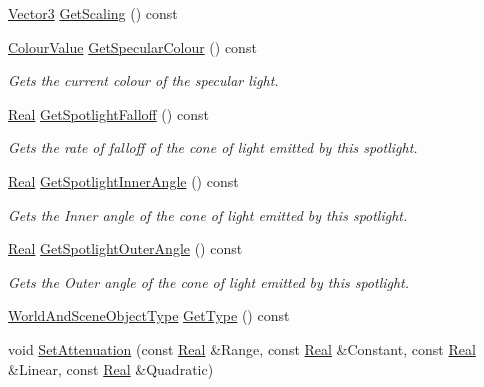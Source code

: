 \begin{DoxyCompactItemize}
\hyperlink{classMezzanine_1_1Vector3}{Vector3} \hyperlink{classMezzanine_1_1Light_ac8742d7d9ac0b4059eeed80b4b566471}{GetScaling} () const 
\item 
\hyperlink{classMezzanine_1_1ColourValue}{ColourValue} \hyperlink{classMezzanine_1_1Light_af3cef4b433cc3563ae3abd3675c5b922}{GetSpecularColour} () const 
\begin{DoxyCompactList}\small\item\em Gets the current colour of the specular light. \item\end{DoxyCompactList}\item 
\hyperlink{namespaceMezzanine_a726731b1a7df72bf3583e4a97282c6f6}{Real} \hyperlink{classMezzanine_1_1Light_adc25087fe48fe78c1bae8785c28d30e0}{GetSpotlightFalloff} () const 
\begin{DoxyCompactList}\small\item\em Gets the rate of falloff of the cone of light emitted by this spotlight. \item\end{DoxyCompactList}\item 
\hyperlink{namespaceMezzanine_a726731b1a7df72bf3583e4a97282c6f6}{Real} \hyperlink{classMezzanine_1_1Light_a88bb2a7515c4f67c8d367acfc1764420}{GetSpotlightInnerAngle} () const 
\begin{DoxyCompactList}\small\item\em Gets the Inner angle of the cone of light emitted by this spotlight. \item\end{DoxyCompactList}\item 
\hyperlink{namespaceMezzanine_a726731b1a7df72bf3583e4a97282c6f6}{Real} \hyperlink{classMezzanine_1_1Light_a750426a53eeed92787c996f8b35c1d32}{GetSpotlightOuterAngle} () const 
\begin{DoxyCompactList}\small\item\em Gets the Outer angle of the cone of light emitted by this spotlight. \item\end{DoxyCompactList}\item 
\hyperlink{namespaceMezzanine_ae8cd04f706f4998be62f454b7119c718}{WorldAndSceneObjectType} \hyperlink{classMezzanine_1_1Light_aa5cd7878d7507c0985d1cec54caa344e}{GetType} () const 
\item 
void \hyperlink{classMezzanine_1_1Light_a67cf2007b51378b1a3d22d1c63b6f54a}{SetAttenuation} (const \hyperlink{namespaceMezzanine_a726731b1a7df72bf3583e4a97282c6f6}{Real} \&Range, const \hyperlink{namespaceMezzanine_a726731b1a7df72bf3583e4a97282c6f6}{Real} \&Constant, const \hyperlink{namespaceMezzanine_a726731b1a7df72bf3583e4a97282c6f6}{Real} \&Linear, const \hyperlink{namespaceMezzanine_a726731b1a7df72bf3583e4a97282c6f6}{Real} \&Quadratic)

\end{DoxyCompactItemize}
